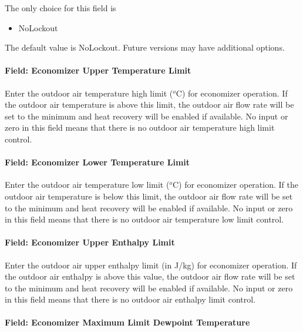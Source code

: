 The only choice for this field is

\begin{itemize}
\tightlist
\item
  NoLockout
\end{itemize}

The default value is NoLockout. Future versions may have additional options.

\paragraph{Field: Economizer Upper Temperature Limit}\label{field-economizer-upper-temperature-limit-1}

Enter the outdoor air temperature high limit (\(^{o}\)C) for economizer operation. If the outdoor air temperature is above this limit, the outdoor air flow rate will be set to the minimum and heat recovery will be enabled if available. No input or zero in this field means that there is no outdoor air temperature high limit control.

\paragraph{Field: Economizer Lower Temperature Limit}\label{field-economizer-lower-temperature-limit-1}

Enter the outdoor air temperature low limit (\(^{o}\)C) for economizer operation. If the outdoor air temperature is below this limit, the outdoor air flow rate will be set to the minimum and heat recovery will be enabled if available. No input or zero in this field means that there is no outdoor air temperature low limit control.

\paragraph{Field: Economizer Upper Enthalpy Limit}\label{field-economizer-upper-enthalpy-limit-1}

Enter the outdoor air upper enthalpy limit (in J/kg) for economizer operation. If the outdoor air enthalpy is above this value, the outdoor air flow rate will be set to the minimum and heat recovery will be enabled if available. No input or zero in this field means that there is no outdoor air enthalpy limit control.

\paragraph{Field: Economizer Maximum Limit Dewpoint Temperature}\label{field-economizer-maximum-limit-dewpoint-temperature-3}

